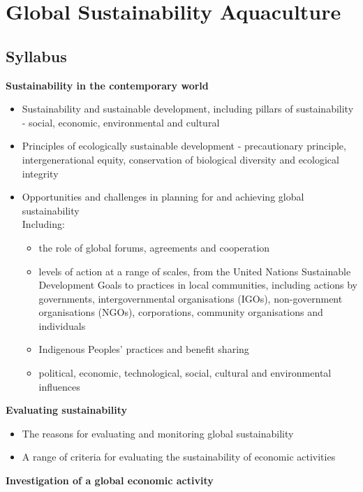 
\chapter{Global Sustainability \hspace{0.5em} Aquaculture}

\section{Syllabus}
	\textbf{Sustainability in the contemporary world}
	\begin{itemize}
		\item Sustainability and sustainable development, including pillars of sustainability - social, economic, environmental and cultural
		\item Principles of ecologically sustainable development - precautionary principle, intergenerational equity, conservation of biological diversity and ecological integrity
		\item Opportunities and challenges in planning for and achieving global sustainability \\ Including:
		\begin{itemize}
			\item the role of global forums, agreements and cooperation
			\item levels of action at a range of scales, from the United Nations Sustainable Development Goals to practices in local communities, including actions by governments, intergovernmental organisations (IGOs), non-government organisations (NGOs), corporations, community organisations and individuals
			\item Indigenous Peoples' practices and benefit sharing 
			\item political, economic, technological, social, cultural and environmental influences
		\end{itemize}
	\end{itemize}

	\textbf{Evaluating sustainability}
	\begin{itemize}
		\item The reasons for evaluating and monitoring global sustainability
		\item A range of criteria for evaluating the sustainability of economic activities
	\end{itemize}
	
	\textbf{Investigation of a global economic activity}

